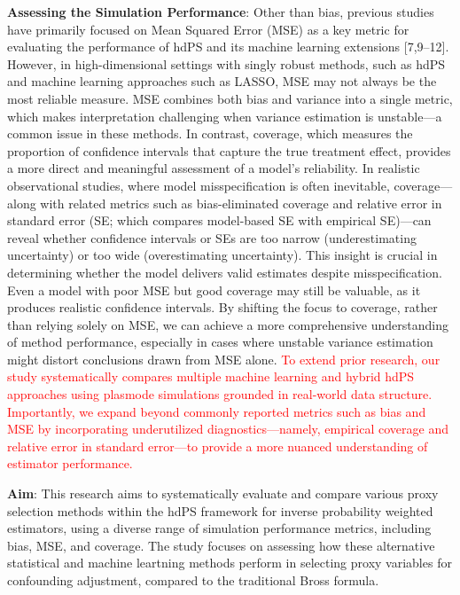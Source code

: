 \documentclass[10pt,letterpaper]{article}
\begin{document}
\textbf{Assessing the Simulation Performance}: Other than bias, previous
studies have primarily focused on Mean Squared Error (MSE) as a key
metric for evaluating the performance of hdPS and its machine learning
extensions {[}7,9--12{]}. However, in high-dimensional settings with
singly robust methods, such as hdPS and machine learning approaches such
as LASSO, MSE may not always be the most reliable measure. MSE combines
both bias and variance into a single metric, which makes interpretation
challenging when variance estimation is unstable---a common issue in
these methods. In contrast, coverage, which measures the proportion of
confidence intervals that capture the true treatment effect, provides a
more direct and meaningful assessment of a model's reliability. In
realistic observational studies, where model misspecification is often
inevitable, coverage---along with related metrics such as
bias-eliminated coverage and relative error in standard error (SE; which
compares model-based SE with empirical SE)---can reveal whether
confidence intervals or SEs are too narrow (underestimating uncertainty)
or too wide (overestimating uncertainty). This insight is crucial in
determining whether the model delivers valid estimates despite
misspecification. Even a model with poor MSE but good coverage may still
be valuable, as it produces realistic confidence intervals. By shifting
the focus to coverage, rather than relying solely on MSE, we can achieve
a more comprehensive understanding of method performance, especially in
cases where unstable variance estimation might distort conclusions drawn
from MSE alone.
\textcolor{red}{To extend prior research, our study systematically compares multiple machine learning and hybrid hdPS approaches using plasmode simulations grounded in real-world data structure. Importantly, we expand beyond commonly reported metrics such as bias and MSE by incorporating underutilized diagnostics—namely, empirical coverage and relative error in standard error—to provide a more nuanced understanding of estimator performance.}

\textbf{Aim}: This research aims to systematically evaluate and compare
various proxy selection methods within the hdPS framework for inverse
probability weighted estimators, using a diverse range of simulation
performance metrics, including bias, MSE, and coverage. The study
focuses on assessing how these alternative statistical and machine
leartning methods perform in selecting proxy variables for confounding
adjustment, compared to the traditional Bross formula.
\end{document}
